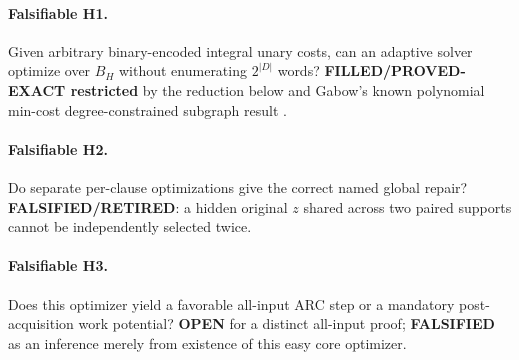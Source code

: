 \documentclass[11pt]{article}
\begin{document}
\paragraph{Falsifiable H1.} Given arbitrary binary-encoded integral unary costs, can an adaptive solver optimize over $B_H$ without enumerating $2^{|D|}$ words? \textbf{FILLED/PROVED-EXACT restricted} by the reduction below and Gabow's known polynomial min-cost degree-constrained subgraph result \cite{gabow83,gabow18}.
\paragraph{Falsifiable H2.} Do separate per-clause optimizations give the correct named global repair? \textbf{FALSIFIED/RETIRED}: a hidden original $z$ shared across two paired supports cannot be independently selected twice.
\paragraph{Falsifiable H3.} Does this optimizer yield a favorable all-input ARC step or a mandatory post-acquisition work potential? \textbf{OPEN} for a distinct all-input proof; \textbf{FALSIFIED} as an inference merely from existence of this easy core optimizer.
\end{document}
